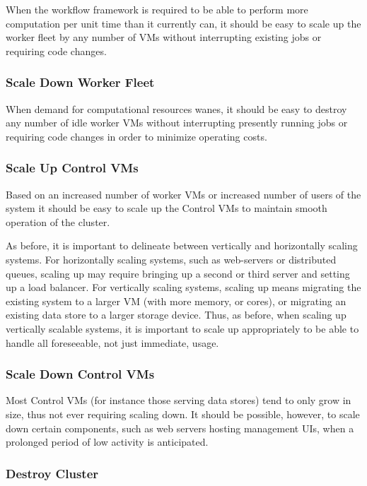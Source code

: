 When the workflow framework is required to be able to perform more computation per unit time than it currently can, it should be easy to scale up the worker fleet by any number of VMs without interrupting existing jobs or requiring code changes. 

\subsubsection {Scale Down Worker Fleet}

When demand for computational resources wanes, it should be easy to destroy any number of idle worker VMs without interrupting presently running jobs or requiring code changes in order to minimize operating costs.

\subsubsection {Scale Up Control VMs}

Based on an increased number of worker VMs or increased number of users of the system it should be easy to scale up the Control VMs to maintain smooth operation of the cluster.

As before, it is important to delineate between vertically and horizontally scaling systems. For horizontally scaling systems, such as web-servers or distributed queues, scaling up may require bringing up a second or third server and setting up a load balancer. For vertically scaling systems, scaling up means migrating the existing system to a larger VM (with more memory, or cores), or migrating an existing data store to a larger storage device. Thus, as before, when scaling up vertically scalable systems, it is important to scale up appropriately to be able to handle all foreseeable, not just immediate, usage.

\subsubsection {Scale Down Control VMs}

Most Control VMs (for instance those serving data stores) tend to only grow in size, thus not ever requiring scaling down. It should be possible, however, to scale down certain components, such as web servers hosting management UIs, when a prolonged period of low activity is anticipated.

\subsubsection {Destroy Cluster}

